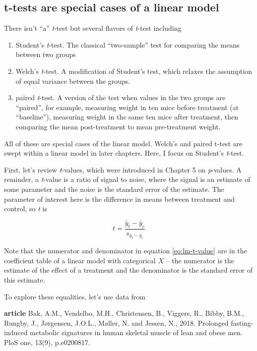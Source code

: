 \documentclass[]{book}
\providecommand{\tightlist}{%
  \setlength{\itemsep}{0pt}\setlength{\parskip}{0pt}}
\begin{document}
\hypertarget{t-tests-are-special-cases-of-a-linear-model}{%
\subsection{t-tests are special cases of a linear model}\label{t-tests-are-special-cases-of-a-linear-model}}

There isn't ``a'' \emph{t}-test but several flavors of \emph{t}-test including

\begin{enumerate}
\def\labelenumi{\arabic{enumi}.}
\tightlist
\item
  Student's \emph{t}-test. The classical ``two-sample'' test for comparing the means between two groups
\item
  Welch's \emph{t}-test. A modification of Student's test, which relaxes the assumption of equal variance between the groups.
\item
  paired \emph{t}-test. A version of the test when values in the two groups are ``paired'', for example, measuring weight in ten mice before treatment (at ``baseline''), measuring weight in the same ten mice after treatment, then comparing the mean post-treatment to mean pre-treatment weight.
\end{enumerate}

All of these are special cases of the linear model. Welch's and paired t-test are swept within a linear model in later chapters. Here, I focus on Student's \emph{t}-test.

First, let's review \emph{t}-values, which were introduced in Chapter 5 on \emph{p}-values. A reminder, a \emph{t}-value is a ratio of signal to noise, where the signal is an estimate of some parameter and the noise is the standard error of the estimate. The parameter of interest here is the difference in means between treatment and control, so \emph{t} is

\begin{equation}
t = \frac{\bar{y}_t - \bar{y}_c}{s_{\bar{y}_t - \bar{y}_c}}
\label{eq:lm-t-value}
\end{equation}

Note that the numerator and denominator in equation \eqref{eq:lm-t-value} are in the coefficient table of a linear model with categorical \(X\) -- the numerator is the estimate of the effect of a treatment and the denominator is the standard error of this estimate.

To explore these equalities, let's use data from

\textbf{article} Bak, A.M., Vendelbo, M.H., Christensen, B., Viggers, R., Bibby, B.M., Rungby, J., Jørgensen, J.O.L., Møller, N. and Jessen, N., 2018. Prolonged fasting-induced metabolic signatures in human skeletal muscle of lean and obese men. PloS one, 13(9), p.e0200817.
\end{document}
